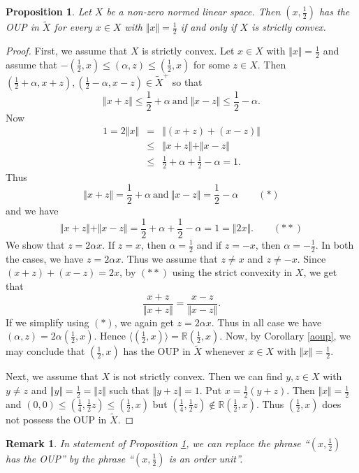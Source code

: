 \documentclass[12pt]{amsart}
\newtheorem{proposition}[theorem]{Proposition}
\newtheorem{remark}[theorem]{Remark}
\begin{document}
\begin{proposition}\label{strict}
	Let $X$ be a non-zero normed linear space. Then $(x, \frac 12)$ has the OUP in $\widetilde{X}$ for every $x \in X$ with $\Vert x \Vert = \frac 12$ if and only if $X$ is strictly convex.
\end{proposition} 
\begin{proof}
	First, we assume that $X$ is strictly convex. Let $x \in X$ with $\Vert x \Vert = \frac 12$ and assume that $- (\frac 12, x) \le (\alpha, z) \le (\frac 12, x)$ for some $z \in X$. Then $(\frac 12 + \alpha, x + z), (\frac 12 - \alpha, x - z) \in \widetilde{X}^+$ so that 
	$$\Vert x + z \Vert \le \frac 12 + \alpha ~ \mbox{and} ~ \Vert x - z \Vert \le \frac 12 - \alpha.$$ 
	Now 
	\begin{eqnarray*}
		1 = 2 \Vert x \Vert &=& \Vert (x + z) + (x - z) \Vert \\ 
		&\le& \Vert x + z \Vert + \Vert x - z \Vert \\ 
		&\le& \frac 12 + \alpha + \frac 12 - \alpha = 1.
	\end{eqnarray*} 
	Thus 
	$$\Vert x + z \Vert = \frac 12 + \alpha ~ \mbox{and} ~ \Vert x - z \Vert = \frac 12 - \alpha \qquad (*) $$ 
	and we have 
	$$\Vert x + z \Vert + \Vert x - z \Vert = \frac 12 + \alpha + \frac 12 - \alpha = 1 = \Vert 2 x \Vert. \qquad (**)$$ 
	We show that $z = 2 \alpha x$. 	If $z = x$, then $\alpha = \frac 12$ and if $z = - x$, then $\alpha = - \frac 12$. In both the cases, we have $z = 2 \alpha x$. Thus we assume that $z \ne x$ and $z \ne - x$. Since $(x + z) + (x - z) = 2 x$, by $(**)$ using the strict convexity in $X$, we get that 
	$$\frac{x + z}{\Vert x + z\Vert} = \frac{x - z}{\Vert x - z\Vert}.$$ 
	If we  simplify using $(*)$, we again get $z = 2 \alpha x$. Thus in all case we have $(\alpha, z) = 2 \alpha (\frac 12, x)$. Hence $\langle (\frac 12, x) \rangle = \mathbb{R} (\frac 12, x)$. Now, by Corollary \ref{aoup}, we may conclude that $(\frac 12, x)$ has the OUP in $\widetilde{X}$ whenever $x \in X$ with $\Vert x \Vert = \frac 12$. 
	
	Next, we assume that $X$ is not strictly convex. Then we can find $y, z \in X$ with $y \ne z$ and $\Vert y \Vert = \frac 12 = \Vert z \Vert$ such that $\Vert y + z \Vert = 1$. Put $x = \frac 12 (y + z)$. Then $\Vert x \Vert = \frac 12$ and $(0, 0) \le (\frac 14, \frac 12 z) \le (\frac 12, x)$ but $(\frac 14, \frac 12 z) \notin \mathbb{R} (\frac 12, x)$. Thus $(\frac 12, x)$ does not possess the OUP in $\widetilde{X}$. 
\end{proof}
\begin{remark}
	In statement of Proposition \ref{strict}, we can replace the phrase ``$(x, \frac 12)$ has the OUP'' by the phrase ``$(x, \frac 12)$ is an order unit''.
\end{remark}
	
\end{document}
